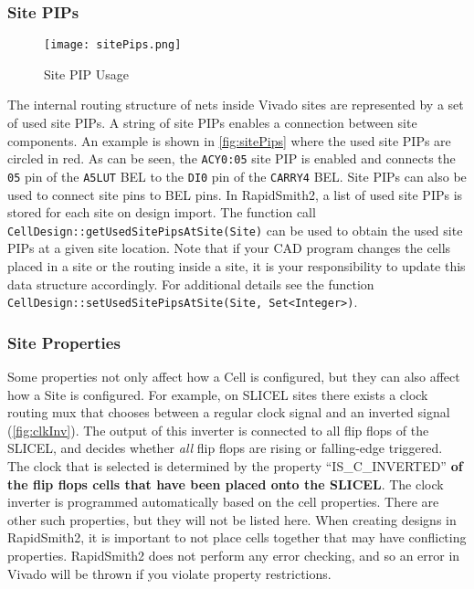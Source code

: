 \subsubsection{Site PIPs}
\begin{figure}[b!]
  \centering
  \texttt{[image: sitePips.png]}
  \caption{Site PIP Usage}
  \label{fig:sitePips}
\end{figure}

The internal routing structure of nets inside Vivado sites are represented by
a set of used site PIPs. A string of site PIPs enables a connection between site
components. An example is shown in \autoref{fig:sitePips} where the used site
PIPs are circled in red. As can be seen, the \texttt{ACY0:05} site PIP is
enabled and connects the \texttt{05} pin of the \texttt{A5LUT} BEL to the
\texttt{DI0} pin of the \texttt{CARRY4} BEL. Site PIPs can also be used to 
connect site pins to BEL pins. In RapidSmith2, a list of used site PIPs is
stored for each site on design import. The function call
\texttt{CellDesign::getUsedSitePipsAtSite(Site)} can be used to obtain the used
site PIPs at a given site location. Note that if your CAD program changes 
the cells placed in a site or the routing inside a site, it is your
responsibility to update this data structure accordingly.  For additional
details see the function \texttt{CellDesign::setUsedSitePipsAtSite(Site,
Set<Integer>)}.

\subsubsection{Site Properties}
Some properties not only affect how a Cell is configured, but they can also
affect how a Site is configured. For example, on SLICEL sites there exists a
clock routing mux that chooses between a regular clock signal and an inverted
signal (\autoref{fig:clkInv}). The output of this inverter is connected to all
flip flops of the SLICEL, and decides whether \textit{all} flip flops are
rising or falling-edge triggered. The clock that is selected is determined
by the property ``IS\_C\_INVERTED'' \textbf{of the flip flops cells that have
been placed onto the SLICEL}. The clock inverter is programmed automatically based on
the cell properties. There are other such properties, but they will not be listed
here. When creating designs in RapidSmith2, it is important to not place cells
together that may have conflicting properties. RapidSmith2 does not perform any
error checking, and so an error in Vivado will be thrown if you violate
property restrictions.

